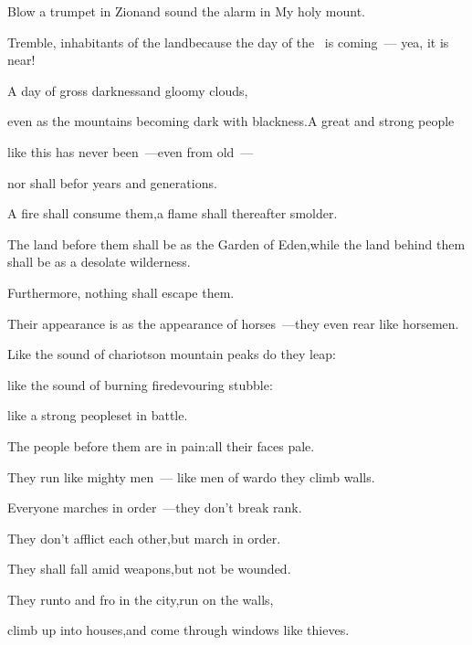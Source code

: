 
\begin{inparaenum}
  \pa{} Blow a trumpet in Zion\pa{}and sound the alarm in My holy mount.%

  \pb{}Tremble, inhabitants of the land\pa{}because the day of the \lord\ is coming~--- yea, it is near!%

  \pa{} A day of gross darkness\pa{}and gloomy clouds,%

  \pb{}even as the mountains becoming dark with blackness.\pa{}A great and strong people%

  \pb{}like this has never been~---\pa{}even from old~---%

  \pb{}nor shall be\pa{}for years and generations.%

  \pa{} A fire shall consume them,\pa{}a flame shall thereafter smolder.%

  \pb{}The land before them shall be as the Garden of Eden,\pa{}while the land behind them shall be as a desolate wilderness.%

  \pb{}Furthermore, nothing shall escape them.%

  \pa{} Their appearance is as the appearance of horses~---\pa{}they even rear like horsemen.%

  \pa{} Like the sound of chariots\pa{}on mountain peaks do they leap:%

  \pb{}like the sound of burning fire\pa{}devouring stubble:%

  \pb{}like a strong people\pa{}set in battle.%

  \pa{} The people before them are in pain:\pa{}all their faces pale.%

  \pa{} They run like mighty men~--- like men of war\pa{}do they climb walls.%

  \pb{}Everyone marches in order~---\pa{}they don't break rank.%

  \pa{} They don't afflict each other,\pa{}but march in order.%

  \pb{}They shall fall amid weapons,\pa{}but not be wounded.%

  \pa{} They run\pa{}to and fro in the city,\pa{}run on the walls,%

  \pb{}climb up into houses,\pa{}and come through windows like thieves.%


\end{inparaenum}

